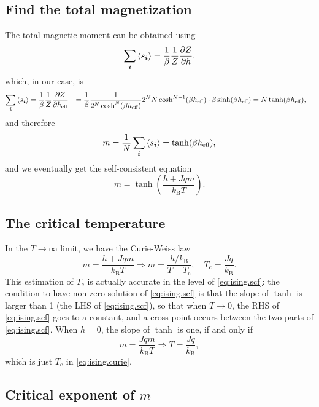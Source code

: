 \documentclass[hyperref, a4paper]{article}
\def\\{}%
\newcommand*{\Tc}{T_{\text{c}}}
\newcommand*{\kB}{k_{\text{B}}}
\begin{document}
\subsection{Find the total magnetization}

The total magnetic moment can be obtained using 
\begin{equation}
    \sum_{\vb*{i}} \expval{s_{\vb*{i}}} = \frac{1}{\beta} \frac{1}{Z} \pdv{Z}{h} , 
\end{equation}
which, in our case, is 
\[
    \begin{aligned}
        \sum_{\vb*{i}} \expval{s_{\vb*{i}}} &= \frac{1}{\beta} \frac{1}{Z} \pdv{Z}{h_{\text{eff}}} \\
        &= \frac{1}{\beta} \frac{1}{2^N \cosh^N (\beta h_{\text{eff}})} 
        2^N N \cosh^{N-1} (\beta h_{\text{eff}}) \cdot \beta \sinh(\beta h_{\text{eff}}) \\
        &= N \tanh (\beta h_{\text{eff}}), 
    \end{aligned}
\]
and therefore 
\[
    m = \frac{1}{N} \sum_{\vb*{i}} \expval{s_{\vb*{i}}}
    = \tanh(\beta h_{\text{eff}}),
\]
and we eventually get the self-consistent equation 
\begin{equation}
    m = \tanh(\frac{h + Jq m}{\kB T}).
    \label{eq:ising.scf}
\end{equation}

\subsection{The critical temperature}

In the $T \to \infty$ limit, we have the Curie-Weiss law 
\begin{equation}
    m = \frac{h + Jqm}{\kB T} \Rightarrow 
    m = \frac{h / \kB}{T - \Tc}, \quad 
    \Tc = \frac{Jq}{\kB}.
    \label{eq:ising.curie}
\end{equation}
This estimation of $\Tc$ is actually accurate in the level of \eqref{eq:ising.scf}: 
the condition to have non-zero solution of \eqref{eq:ising.scf} 
is that the slope of $\tanh$ is larger than 1 (the LHS of \eqref{eq:ising.scf}), 
so that when $T \to 0$, 
the RHS of \eqref{eq:ising.scf} goes to a constant, 
and a cross point occurs between the two parts of \eqref{eq:ising.scf}.
When $h = 0$, the slope of $\tanh$ is one, if and only if 
\[
    m = \frac{J q m}{\kB T} \Rightarrow T = \frac{J q}{\kB},
\]
which is just $\Tc$ in \eqref{eq:ising.curie}.

\subsection{Critical exponent of $m$}
\end{document}
